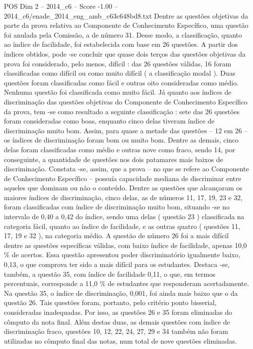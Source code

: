 \begin{textsample}{POS Dim 2 – 2014\_c6 – Score -1.00 – 2014\_c6/enade\_2014\_eng\_amb\_c63c648bd8.txt}
Dentre as questões objetivas da parte da prova relativa ao Componente de Conhecimento Específico, uma questão foi anulada pela Comissão, a de número 31.
Desse modo, a classificação, quanto ao índice de facilidade, foi estabelecida com base em 26 questões.
A partir dos índices obtidos, pode -se concluir que quase dois terços das questões objetivas da prova foi considerado, pelo menos, difícil : das 26 questões válidas, 16 foram classificadas como difícil ou como muito difícil ( a classificação modal ).
Duas questões foram classificadas como fácil e outras oito consideradas como médio.
Nenhuma questão foi classificada como muito fácil.
Já quanto aos índices de discriminação das questões objetivas do Componente de Conhecimento Específico da prova, tem -se como resultado a seguinte classificação : sete das 26 questões foram consideradas como boas, enquanto cinco delas tiveram índice de discriminação muito bom.
Assim, para quase a metade das questões – 12 em 26 – os índices de discriminação foram bom ou muito bom.
Dentre as demais, cinco delas foram classificadas como médio e outras nove como fraco, sendo 14, por conseguinte, a quantidade de questões nos dois patamares mais baixos de discriminação.
Constata -se, assim, que a prova – no que se refere ao Componente de Conhecimento Específico – possuía capacidade mediana de discriminar entre aqueles que dominam ou não o conteúdo.
Dentre as questões que alcançaram os maiores índices de discriminação, cinco delas, as de números 11, 17, 19, 23 e 32, foram classificadas com índice de discriminação muito bom, situando -se no intervalo de 0,40 a 0,42 do índice, sendo uma delas ( questão 23 ) classificada na categoria fácil, quanto ao índice de facilidade, e as outras quatro ( questões 11, 17, 19 e 32 ), na categoria médio.
A questão de número 26 foi a mais difícil dentre as questões específicas válidas, com baixo índice de facilidade, apenas 10,0 \% de acertos.
Essa questão apresentou poder discriminatório igualmente baixo, 0,13, o que comprova ter sido a mais difícil para os estudantes.
Destaca -se, também, a questão 35, com índice de facilidade 0,11, o que, em termos percentuais, corresponde a 11,0 \% de estudantes que responderam acertadamente.
Na questão 35, o índice de discriminação, 0,001, foi ainda mais baixo que o da questão 26.
Tais questões foram, portanto, pelo critério ponto bisserial, consideradas inadequadas.
Por isso, as questões 26 e 35 foram eliminadas do cômputo da nota final.
Além destas duas, as demais questões com índice de discriminação fraco, questões 10, 12, 22, 24, 27, 29 e 34 também não foram utilizadas no cômputo final das notas, num total de nove questões eliminadas.

\end{textsample}
